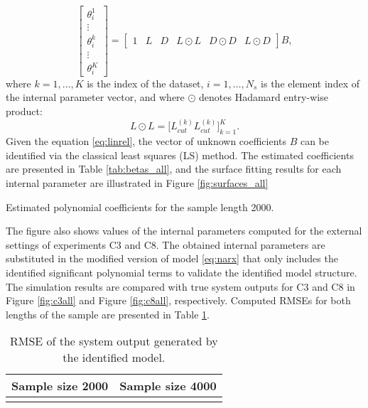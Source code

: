 \documentclass[a4paper,11pt,twoside]{article}
\def\dataset{C}
\theoremstyle{mytheoremstyle}
\begin{document}
\begin{equation}\label{eq:linrel}
\left[\begin{array}{c}
\theta_{i}^{1} \\
\vdots \\
\theta_{i}^{k} \\
\vdots \\
\theta_{i}^{K}
\end{array}\right] =
\left[\begin{array}{cccccc}
1 & L& D& L\odot L& D\odot D& L\odot D
\end{array}\right] B,
\end{equation}
where $k = 1, \dots, K$ is the index of the dataset, $i =1, \dots, N_s$ is the element index of the internal parameter vector, and where $\odot$ denotes Hadamard entry-wise product:
\begin{equation*}
L\odot L = \Big[ L_{cut}^{(k)} L_{cut}^{(k)}\Big]^{K}_{k=1}.
\end{equation*}
Given the equation \eqref{eq:linrel}, the vector of unknown coefficients $B$ can be identified via the classical least squares (LS) method. The estimated coefficients are presented in Table \ref{tab:betas_all}, and the surface fitting results for each internal parameter are illustrated in Figure \ref{fig:surfaces_all} 
\begin{table}[!h]
	\centering
	\caption{Estimated polynomial coefficients for the sample length 2000.}\label{tab:betas_all}
	\small
	
\end{table}
The figure also shows values of the internal parameters computed for the external settings of experiments \dataset3 and \dataset8. The obtained internal parameters are substituted in the modified version of model \eqref{eq:narx} that only includes the identified significant  polynomial terms to validate the identified model structure. The simulation results are compared with true system outputs for \dataset3 and \dataset8 in Figure \ref{fig:c3all} and Figure \ref{fig:c8all}, respectively. Computed RMSEs for both lengths of the sample are presented in Table \ref{tab:RMSEs}.
\begin{table}[!h]
	\centering
	\caption{RMSE of the system output generated by the identified model.}\label{tab:RMSEs}
		\begin{tabular}{cc}
			Sample size 2000 & Sample size 4000 \\
			\hline	
			\begin{minipage}{2in} \end{minipage}& 
			\begin{minipage}{2in} \vspace{0.5cm}\end{minipage}\\
			\hline
		\end{tabular}
\end{table}
\end{document}
